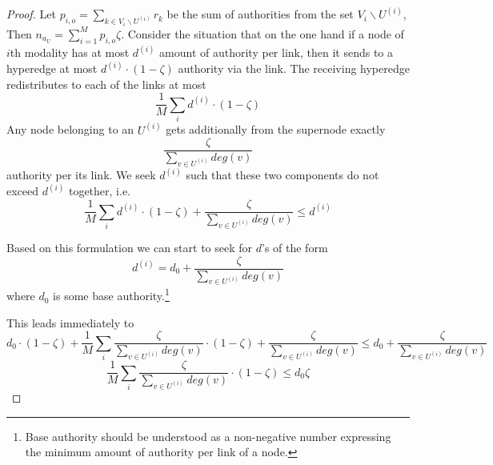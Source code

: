 \documentclass{fundam}
\newcommand{\N}{ V }
\begin{document}
\begin{proof}
Let  $p_{i,o}=\sum_{k \in \N_i \backslash U^{(i)}}r_k$ be the sum of authorities from the set $\N_i \backslash U^{(i)}$,
Then $n_{a_U}=\sum_{i=1}^M p_{i,o}\zeta$.
Consider   the situation that on the one hand if a node of $i$th modality has at most $d^{(i)}$ amount of authority per link, then it sends to a hyperedge at most $d^{(i)}{\cdot}(1-\zeta)$ authority via the link.
The receiving hyperedge redistributes
to each of  the  links at most $$\frac1M\sum_id^{(i)}{\cdot}(1-\zeta)$$
Any node belonging to an $U^{(i)}$  gets additionally from the supernode exactly
$$\frac{\zeta }{\sum_{v \in U^{(i)}}deg(v)}$$  authority per its link.
We seek   $d^{(i)}$ such that these two components do not exceed $d^{(i)}$ together, i.e.
$$ \frac1M\sum_id^{(i)}{\cdot}(1-\zeta)
 +
 \frac{\zeta }{\sum_{v \in U^{(i)}}deg(v)}  \le d^{(i)} $$

 Based on this formulation we can start to seek for   $d$'s of the form
$$d^{(i)}=d_0+ \frac{\zeta }{\sum_{v \in U^{(i)}}deg(v)}  $$
where $d_0$ is some base authority.\footnote{Base authority should be understood as a non-negative number expressing the minimum amount of authority per link of a node.}

\eject

This leads immediately to
$$ d_0\cdot (1-\zeta)+ \frac1M\sum_i\frac{\zeta }{\sum_{v \in U^{(i)}}deg(v)}{\cdot}(1-\zeta)
 +
 \frac{\zeta }{\sum_{v \in U^{(i)}}deg(v)}  \le
d_0+ \frac{\zeta }{\sum_{v \in U^{(i)}}deg(v)}
 $$
$$   \frac1M\sum_i\frac{\zeta }{\sum_{v \in U^{(i)}}deg(v)}{\cdot}(1-\zeta)
   \le d_0 \zeta
 $$


\end{proof}
\end{document}
